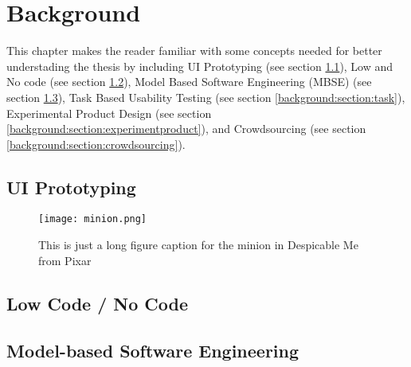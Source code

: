 
\chapter{Background}
\ifpdf
    \graphicspath{{Chapters/Background/Figs/}{Chapters/Background/Figs/}{Chapters/Background/Figs/}}
\else
    \graphicspath{{Chapters/Background/Figs/}{Chapters/Background/Figs/}}
\fi
This chapter makes the reader familiar with some concepts needed for better understading the thesis by including UI Prototyping (see section \ref{background:section:uiprototyping}), Low and No code (see section \ref{background:section:lowcode}), Model Based Software Engineering (MBSE) (see section \ref{background:section:mbse}), Task Based Usability Testing (see section \ref{background:section:task}), Experimental Product Design (see section \ref{background:section:experimentproduct}), and Crowdsourcing (see section \ref{background:section:crowdsourcing}).

\section{UI Prototyping}
\label{background:section:uiprototyping}

\begin{figure}[htbp!] 
\centering    
\texttt{[image: minion.png]}
\caption[Minion]{This is just a long figure caption for the minion in Despicable Me from Pixar}
\label{fig:minion}
\end{figure}

\section{Low Code / No Code}
\label{background:section:lowcode}

\section{Model-based Software Engineering}
\label{background:section:mbse}

